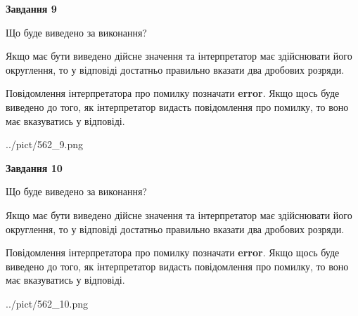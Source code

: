 \documentclass[12pt, ukrainian]{article}
\begin{document}
{\begin {Large}
{\begin {center}\textbf{Завдання 9}\end {center}}\par
Що буде виведено за виконання? \par

Якщо має бути виведено дійсне значення та інтерпретатор має здійснювати його округлення, 
то у відповіді достатньо правильно вказати два дробових розряди.

Повідомлення інтерпретатора про помилку позначати \textbf{error}.
Якщо щось буде виведено до того, як інтерпретатор видасть повідомлення про помилку, 
то воно має вказуватись у відповіді. \par

\begin{center}
	{../pict/562_9.png}
\end{center}
\newpage

{\begin {center}\textbf{Завдання 10}\end {center}}\par
Що буде виведено за виконання? \par

Якщо має бути виведено дійсне значення та інтерпретатор має здійснювати його округлення, 
то у відповіді достатньо правильно вказати два дробових розряди.

Повідомлення інтерпретатора про помилку позначати \textbf{error}.
Якщо щось буде виведено до того, як інтерпретатор видасть повідомлення про помилку, 
то воно має вказуватись у відповіді. \par

\begin{center}
	{../pict/562_10.png}
\end{center}
\newpage

\end {Large}}
\end{document}
